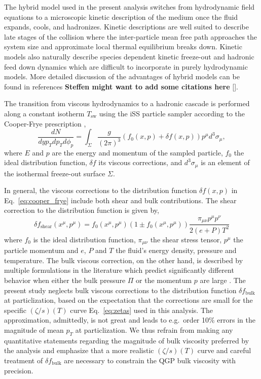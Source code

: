 \documentclass[aps,prc,reprint,amsmath,nofootinbib,superscriptaddress]{revtex4-1}
\begin{document}
The hybrid model used in the present analysis switches from hydrodynamic field equations to a microscopic kinetic description of the medium once the fluid expands, cools, and hadronizes.
Kinetic descriptions are well suited to describe late stages of the collision where the inter-particle mean free path approaches the system size and approximate local thermal equilibrium breaks down.
Kinetic models also naturally describe species dependent kinetic freeze-out and hadronic feed down dynamics which are difficult to incorporate in purely hydrodynamic models.
More detailed discussion of the advantages of hybrid models can be found in references {\bf Steffen might want to add some citations here} \ref{}.

The transition from viscous hydrodynamics to a hadronic cascade is performed along a constant isotherm $T_\text{sw}$ using the iSS particle sampler \cite{Shen:2014vra, Qiu:2013wca} according to the Cooper-Frye prescription \cite{Cooper:1974mv},
\begin{equation}
  \frac{dN}{dy p_T dp_T d\phi_p} =
    \int_\Sigma \frac{g}{(2\pi)^3} (f_0(x,p) + \delta f(x,p)) p^\mu d^3 \sigma_\mu,
  \label{eq:cooper_frye}
\end{equation}
where $E$ and $p$ are the energy and momentum of the sampled particle, $f_0$ the ideal distribution function, $\delta f$ its viscous corrections, and $d^3\sigma_\mu$ is an element of the isothermal freeze-out surface $\Sigma$.

In general, the viscous corrections to the distribution function $\delta f(x, p)$ in Eq.~\eqref{eq:cooper_frye} include both shear and bulk contributions.
The shear correction to the distribution function is given by,
\begin{equation}
  \delta f_\text{shear}(x^\mu, p^\mu) =
    f_0(x^\mu, p^\mu)(1 \pm f_0(x^\mu, p^\mu))
    \frac{\pi_{\mu\nu}p^\mu p^\nu}{2(e+P)T^2}
\end{equation}
where $f_0$ is the ideal distribution function, $\pi_{\mu\nu}$ the shear stress tensor, $p^\mu$ the particle momentum and $e$, $P$ and $T$ the fluid's energy density, pressure and temperature.
The bulk viscous correction, on the other hand, is described by multiple formulations in the literature which predict significantly different behavior when either the bulk pressure $\Pi$ or the momentum $p$ are large \cite{Dusling:2011fd, Noronha-Hostler:2013gga}.
The present study neglects bulk viscous corrections to the distribution function $\delta f_\text{bulk}$ at particlization, based on the expectation that the corrections are small for the specific $(\zeta/s)(T)$ curve Eq.~\eqref{eq:zetas} used in this analysis.
The approximation, admittedly, is not great and leads to e.g.\ order 10\% errors in the magnitude of mean $p_T$ at particlization.
We thus refrain from making any quantitative statements regarding the magnitude of bulk viscosity preferred by the analysis and emphasize that a more realistic $(\zeta/s)(T)$ curve and careful treatment of $\delta f_\text{bulk}$ are necessary to constrain the QGP bulk viscosity with precision.
\end{document}
